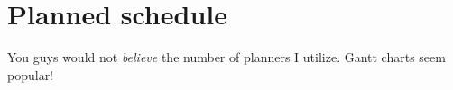 
\chapter{Planned schedule} \label{ch-schedule}

You guys would not \emph{believe} the number of planners I utilize. Gantt charts seem popular!

